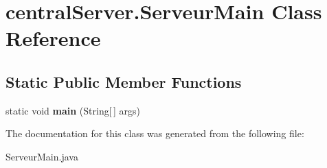 \hypertarget{classcentralServer_1_1ServeurMain}{}\section{central\+Server.\+Serveur\+Main Class Reference}
\label{classcentralServer_1_1ServeurMain}
\subsection*{Static Public Member Functions}
\begin{DoxyCompactItemize}
\item 
\mbox{\label{classcentralServer_1_1ServeurMain_a535af6b66e8147b80c6de518a0bf5cc2}} 
static void {\bfseries main} (String\mbox{[}$\,$\mbox{]} args)
\end{DoxyCompactItemize}


The documentation for this class was generated from the following file\+:\begin{DoxyCompactItemize}
\item 
Serveur\+Main.\+java\end{DoxyCompactItemize}
